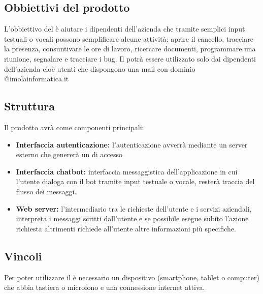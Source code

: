 \subsection{Obbiettivi del prodotto}
L'obbiettivo del  è aiutare i dipendenti dell'azienda che tramite semplici input testuali
o vocali possono semplificare alcune attività: aprire il cancello, tracciare la presenza, 
consuntivare le ore di lavoro, ricercare documenti, programmare una riunione, segnalare e 
tracciare i bug. \newline
Il  potrà essere utilizzato solo dai dipendenti dell'azienda cioè utenti che dispongono una
mail con dominio @imolainformatica.it

\subsection{Struttura}
Il prodotto avrà come componenti principali:
\begin{itemize}
    \item \textbf{Interfaccia autenticazione:} l'autenticazione avverrà mediante un server esterno che 
                genererà un  di accesso
    \item \textbf{Interfaccia chatbot:} interfaccia messaggistica dell'applicazione in cui l'utente dialoga 
                con il bot tramite input testuale o vocale, resterà traccia del flusso dei messaggi.
    \item \textbf{Web server:} l'intermediario tra le richieste dell'utente e i servizi aziendali, interpreta 
                i messaggi scritti dall'utente e se possibile esegue subito l'azione richiesta altrimenti 
                richiede all'utente altre informazioni più specifiche.
\end{itemize}

\subsection{Vincoli}
Per poter utilizzare il  è necessario un dispositivo (smartphone, tablet o computer) che 
abbia tastiera o microfono e una connessione internet attiva.

